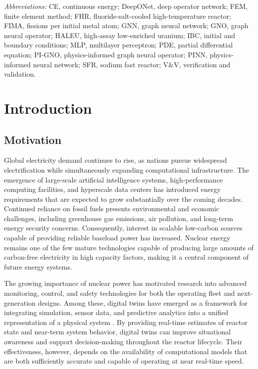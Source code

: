 \documentclass[preprint,12pt]{elsarticle}
\begin{document}
\noindent\textit{Abbreviations:} CE, continuous energy; DeepONet, deep operator
network; FEM, finite element method; FHR, fluoride-salt-cooled
high-temperature reactor; FIMA, fissions per initial metal atom; GNN, graph
neural network; GNO, graph neural operator; HALEU, high-assay low-enriched
uranium; IBC, initial and boundary conditions; MLP, multilayer perceptron;
PDE, partial differential equation; PI-GNO, physics-informed graph neural
operator; PINN, physics-informed neural network; SFR, sodium fast reactor;
V\&V, verification and validation.

\section{Introduction}
\label{sec:intro}

\subsection{Motivation}
\label{sec:motivation}

Global electricity demand continues to rise, as nations pursue widespread
electrification while simultaneously expanding computational infrastructure.
The emergence of large-scale artificial intelligence systems,
high-performance computing facilities, and hyperscale data centers has
introduced energy requirements that are expected to grow substantially over
the coming decades. Continued reliance on fossil fuels presents environmental
and economic challenges, including greenhouse gas emissions, air pollution, and
long-term energy security concerns. Consequently, interest in scalable
low-carbon sources capable of providing reliable baseload power has increased.
Nuclear energy remains one of the few mature technologies capable of producing
large amounts of carbon-free electricity in high capacity factors, making
it a central component of future energy systems.

The growing importance of nuclear power has motivated research into advanced
monitoring, control, and safety technologies for both the operating fleet and
next-generation designs. Among these, digital twins have emerged as a
framework for integrating simulation, sensor data, and predictive analytics
into a unified representation of a physical system \citep{kobayashi2024}. By
providing real-time
estimates of reactor state and near-term system behavior, digital twins can
improve situational awareness and support decision-making throughout the
reactor lifecycle. Their effectiveness, however, depends on the availability
of computational models that are both sufficiently accurate and capable of
operating at near real-time speed.
\end{document}
